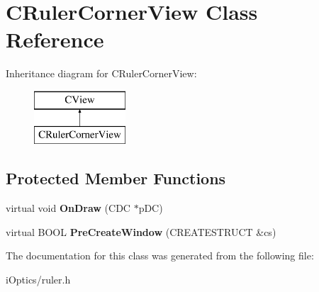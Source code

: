 \hypertarget{class_c_ruler_corner_view}{}\section{C\+Ruler\+Corner\+View Class Reference}
\label{class_c_ruler_corner_view}
Inheritance diagram for C\+Ruler\+Corner\+View\+:\begin{figure}[H]
\begin{center}
\leavevmode
\includegraphics[height=2.000000cm]{class_c_ruler_corner_view}
\end{center}
\end{figure}
\subsection*{Protected Member Functions}
\begin{DoxyCompactItemize}
\item 
\mbox{\label{class_c_ruler_corner_view_a8ce27cc078fe4056f1f4f0fdbe6c0c66}} 
virtual void {\bfseries On\+Draw} (C\+DC $\ast$p\+DC)
\item 
\mbox{\label{class_c_ruler_corner_view_a204e8f055a1e067b8df69ae8c758954f}} 
virtual B\+O\+OL {\bfseries Pre\+Create\+Window} (C\+R\+E\+A\+T\+E\+S\+T\+R\+U\+CT \&cs)
\end{DoxyCompactItemize}


The documentation for this class was generated from the following file\+:\begin{DoxyCompactItemize}
\item 
i\+Optics/ruler.\+h\end{DoxyCompactItemize}
